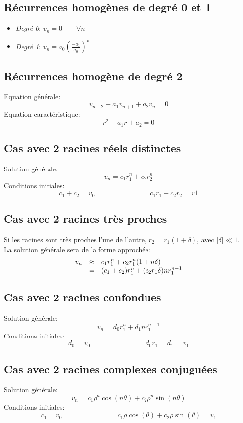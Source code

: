 \subsection{Récurrences homogènes de degré 0 et 1}
\begin{itemize}
  \item \emph{Degré 0}: $v_n = 0 \qquad \forall n$\\
  \item \emph{Degré 1}: $v_n = v_0\left (\frac{-a_1}{a_0} \right )^n$\\
\end{itemize}

\subsection{Récurrences homogène de degré 2}
Equation générale:
\[ v_{n+2} + a_1v_{n+1} + a_2v_n = 0 \]
Equation caractéristique:
\[ r^2 + a_1r + a_2 = 0 \]
\subsection{Cas avec 2 racines réels distinctes}
Solution générale:
\[ v_n = c_1r_1^n + c_2r_2^n \]
Conditions initiales:
\[ c_1 + c_2 = v_0 \qquad{\qquad{\qquad{\qquad}}} c_1r_1 + c_2r_2 = v1 \]
\subsection{Cas avec 2 racines très proches}
Si les racines sont très proches l'une de l'autre, $r_2 = r_1(1 + \delta )$, avec $|\delta | \ll 1$.\\
La solution générale sera de la forme approchée:
\[
  \begin{array}{r c l}
    v_n &\approx &c_1r_1^n + c_2r_1^n(1 + n\delta)\\
    &=&(c_1 + c_2)r_1^n + (c_2r_1\delta )nr_1^{n-1}\\
  \end{array}
\]

\subsection{Cas avec 2 racines confondues}
Solution générale:
\[ v_n = d_0r_1^n + d_1nr_1^{n-1} \]
Conditions initiales:
\[ d_0 = v_0 \qquad{\qquad{\qquad{\qquad}}} d_0r_1 = d_1 = v_1 \]
\subsection{Cas avec 2 racines complexes conjuguées}
Solution générale:
\[ v_n = c_1\rho{^n}\cos{(n\theta)} + c_2\rho{^n}\sin{(n\theta)} \]
Conditions initiales:
\[ c_1 = v_0 \qquad{\qquad{\qquad{\qquad}}} c_1\rho\cos{(\theta)} + c_2\rho\sin{(\theta)} = v_1 \]


